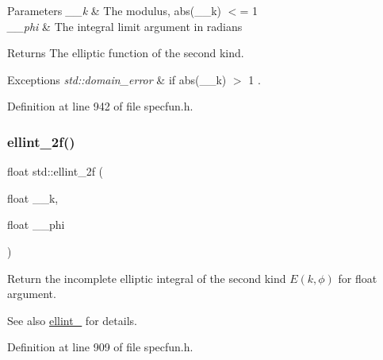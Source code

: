 \begin{DoxyParams}{Parameters}
{\em \+\_\+\+\_\+k} & The modulus, {\ttfamily  abs(\+\_\+\+\_\+k) $<$= 1 } \\
\hline
{\em \+\_\+\+\_\+phi} & The integral limit argument in radians \\
\hline
\end{DoxyParams}
\begin{DoxyReturn}{Returns}
The elliptic function of the second kind. 
\end{DoxyReturn}

\begin{DoxyExceptions}{Exceptions}
{\em std\+::domain\+\_\+error} & if {\ttfamily  abs(\+\_\+\+\_\+k) $>$ 1 }. \\
\hline
\end{DoxyExceptions}


Definition at line 942 of file specfun.\+h.

\mbox{\label{group__tr29124__math__spec__func_ga594a730163c6228c75b152462700062b}} 
\subsubsection{\texorpdfstring{ellint\+\_\+2f()}{ellint\_2f()}}
{\footnotesize\ttfamily float std\+::ellint\+\_\+2f (\begin{DoxyParamCaption}\item[{float}]{\+\_\+\+\_\+k,  }\item[{float}]{\+\_\+\+\_\+phi }\end{DoxyParamCaption})\hspace{0.3cm}{\ttfamily [inline]}}



Return the incomplete elliptic integral of the second kind $ E(k,\phi) $ for {\ttfamily float} argument. 

\begin{DoxySeeAlso}{See also}
\hyperlink{group__tr29124__math__spec__func_ga6db0d1043cad03894edb7def7b70bc39}{ellint\+\_} for details. 
\end{DoxySeeAlso}


Definition at line 909 of file specfun.\+h.

